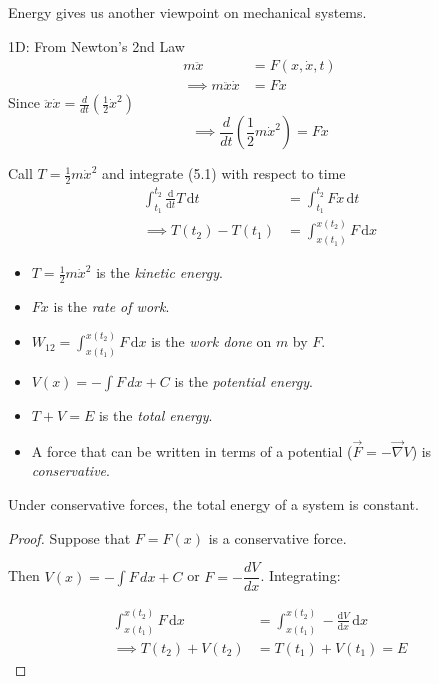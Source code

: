 \documentclass[10pt]{scrartcl}
\begin{document}
 
  
  
  




Energy  gives us another viewpoint on mechanical systems. 

1D: From Newton's 2nd Law
\[\begin{aligned}
m\ddot{x} &= F(x,\dot{x},t)\\
 \implies m\ddot{x}\dot{x} &= F\dot{x}
\end{aligned}\]
Since $\ddot{x}\dot{x} = \frac{d}{dt}\left(\frac{1}{2}\dot{x}^2\right)$ \begin{equation}\implies \boxed{ \frac{d}{dt}\left(\frac{1}{2}m\dot{x}^2\right) = F\dot{x}}\end{equation}


Call $T = \frac{1}{2}m\dot{x}^2$ and integrate (5.1) with respect to time
\[\begin{aligned}\int_{t_1}^{t_2}\frac{\mathrm{d}}{\mathrm{d}t}T\,\mathrm{d}t &= \int_{t_1}^{t_2}F\dot{x}\,\mathrm{d}t\\ 
\implies T(t_2) - T(t_1) &= \int_{x(t_1)}^{x(t_2)}F\,\mathrm{d}x	
\end{aligned}
\]

\begin{definition}
\begin{itemize}
\item $T = \frac{1}{2}m\dot{x}^2$ is the \emph{kinetic energy}.
\item  $F\dot{x}$ is the \emph{rate of work}.	
\item $\displaystyle{W_{12} = \int_{x(t_1)}^{x(t_2)}F\,\mathrm{d}x	}$ is the \emph{work done} on $m$ by $F$.
\item $\displaystyle{V(x) = -\int F\,dx + C}$ is the \emph{potential energy}.
\item $T + V = E$ is the \emph{total energy}. 
\item A force that can be written in terms of a potential ($\vec{F} = -\vec{\nabla}V$) is \emph{conservative}.
\end{itemize}
\end{definition}


\begin{theorem}
Under conservative forces, the total energy of a system is constant.
\end{theorem}
\begin{proof}

Suppose that $F = F(x)$ is a conservative force. 

Then $V(x) = -\int F\,dx + C$ or $F = -\dfrac{dV}{dx}$. Integrating:

\[\begin{aligned}  \int_{x(t_1)}^{x(t_2)}F\,\mathrm{d}x	 &= \int_{x(t_1)}^{x(t_2)} - \frac{\mathrm{d}V}{\mathrm{d}x}\,\mathrm{d}x\\[0.1cm]
\implies T(t_2) + V(t_2) &= T(t_1) + V(t_1) = E
\end{aligned}
\] \end{proof}
\end{document}
